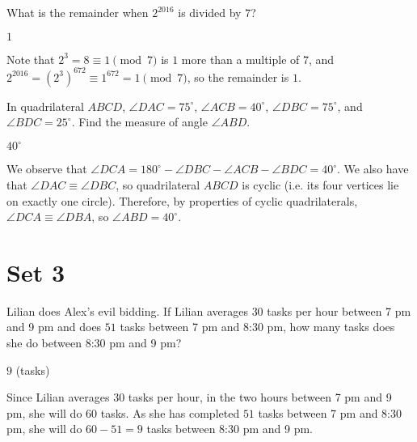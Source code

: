 \documentclass[11pt]{article}
\begin{document}
\begin{problem}%
What is the remainder when $2^{2016}$ is divided by $7$?
\end{problem}

\begin{answer}
$\boxed{1}$
\end{answer}

\begin{solution}
Note that $2^3 = 8 \equiv 1 \pmod{7}$ is $1$ more than a multiple of $7$, and $2^{2016} = (2^3)^{672} \equiv 1^{672} = 1 \pmod{7}$, so the remainder is $\boxed{1}$.
\end{solution}


\begin{problem}%
In quadrilateral $ABCD$, $\angle DAC = 75^\circ$, $\angle ACB = 40^\circ$, $\angle DBC = 75^\circ$, and $\angle BDC = 25^\circ$. Find the measure of angle $\angle ABD$.
\end{problem}

\begin{answer}
$\boxed{40^\circ}$
\end{answer}

\begin{solution}
We observe that $\angle DCA = 180^\circ - \angle DBC - \angle ACB - \angle BDC = 40^\circ$. We also have that $\angle DAC \equiv \angle DBC$, so quadrilateral $ABCD$ is cyclic (i.e. its four vertices lie on exactly one circle). Therefore, by properties of cyclic quadrilaterals, $\angle DCA \equiv \angle DBA$, so $\angle ABD = \boxed{40^\circ}$.
\end{solution}

\newpage


\section*{Set 3}

\begin{problem}%
Lilian does Alex's evil bidding. If Lilian averages $30$ tasks per hour between 7 pm and 9 pm and does $51$ tasks between 7 pm and 8:30 pm, how many tasks does she do between 8:30 pm and 9 pm?
\end{problem}

\begin{answer}
$\boxed{9}$ (tasks)
\end{answer}

\begin{solution}
Since Lilian averages $30$ tasks per hour, in the two hours between 7 pm and 9 pm, she will do $60$ tasks. As she has completed $51$ tasks between 7 pm and 8:30 pm, she will do $60 - 51 = \boxed{9}$ tasks between 8:30 pm and 9 pm.
\end{solution}
\end{document}
